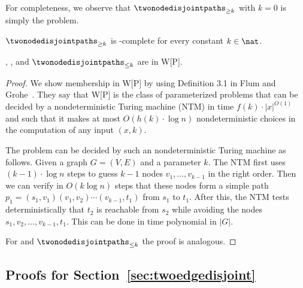 \documentclass[a4paper,english]{lipics-v2016}
\theoremstyle{plain}
\begin{document}
For completeness, we observe that $\twonodedisjointpaths_{\geq k}$ with
$k=0$ is simply the \twonodedisjointpaths problem.
\begin{lemma}\label{lem:fortune}
  $\twonodedisjointpaths_{\geq k}$ is \np-complete for every constant $k \in \nat$.
\end{lemma}


\begin{lemma}\label{lem:UpperBound}
  \knodecolordisjointpaths, \knodedisjointpaths, and $\twonodedisjointpaths_{\leq k}$ are in W[P].
\end{lemma}
\begin{proof}
  We show membership in W[P] by using Definition 3.1 in Flum and Grohe~\cite{FlumG-springer06}.    They say that W[P] is the class of parameterized problems that can
  be decided by a nondeterministic Turing machine (NTM) in time
  $f(k)\cdot |x|^{O(1)}$ and such that it makes at most $O(h(k)\cdot
  \log n)$ nondeterministic choices in the computation of any input $(x,k)$.
 
    The problem \knodedisjointpaths can be decided by such an nondeterministic Turing machine as follows. Given a graph $G=(V,E)$ and a parameter $k$.
    The NTM
    first uses $(k-1) \cdot \log n$ steps to guess $k-1$ nodes $v_1,\ldots, v_{k-1}$
    in the right order. Then we can verify in $O(k \log n)$ steps that these
    nodes form a simple path $p_1=(s_1, v_1)(v_1, v_2) \cdots
    (v_{k-1}, t_1)$ from $s_1$ to $t_1$.  
    After this, the NTM     tests deterministically that $t_2$ is reachable from $s_2$ while
    avoiding the nodes $s_1,v_2,\ldots,v_{k-1},t_1$. This can be done
    in time polynomial in $|G|$.

    For \knodecolordisjointpaths and $\twonodedisjointpaths_{\leq k}$  the proof is analogous.
\end{proof}





\subsection{Proofs for Section~\ref{sec:twoedgedisjoint}}
\end{document}
